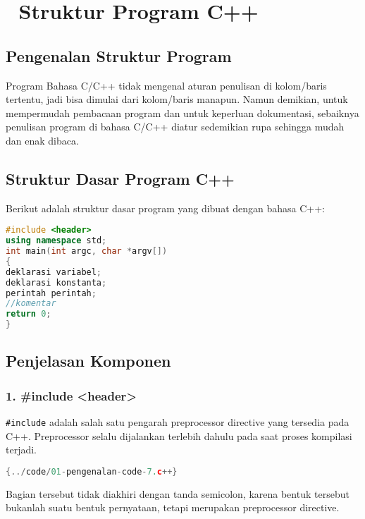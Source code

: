 \section{📝 Struktur Program C++}

\subsection{Pengenalan Struktur Program}

Program Bahasa C/C++ tidak mengenal aturan penulisan di kolom/baris tertentu, jadi bisa dimulai dari kolom/baris manapun. Namun demikian, untuk mempermudah pembacaan program dan untuk keperluan dokumentasi, sebaiknya penulisan program di bahasa C/C++ diatur sedemikian rupa sehingga mudah dan enak dibaca.

\subsection{Struktur Dasar Program C++}

Berikut adalah struktur dasar program yang dibuat dengan bahasa C++:

\begin{lstlisting}[language=c++, caption=Struktur Program C++]
#include <header>  
using namespace std;    
int main(int argc, char *argv[])
{  
deklarasi variabel;   
deklarasi konstanta;  
perintah perintah;  
//komentar  
return 0;  
}  
\end{lstlisting}

\subsection{Penjelasan Komponen}

\subsubsection{1. \#include <header>}

\texttt{\#include} adalah salah satu pengarah preprocessor directive yang tersedia pada C++. Preprocessor selalu dijalankan terlebih dahulu pada saat proses kompilasi terjadi.

\begin{lstlisting}[language=c++]{../code/01-pengenalan-code-7.c++}
\end{lstlisting}

Bagian tersebut tidak diakhiri dengan tanda semicolon, karena bentuk tersebut bukanlah suatu bentuk pernyataan, tetapi merupakan preprocessor directive.

